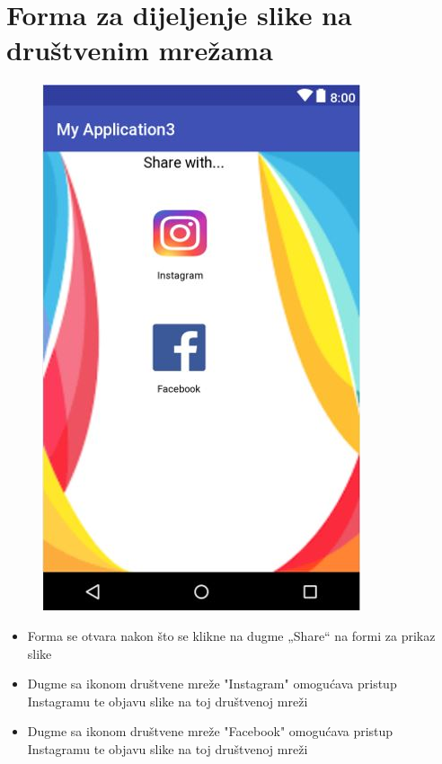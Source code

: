 \documentclass[12pt]{scrreprt}
\begin{document}
\section{Forma za dijeljenje slike na društvenim mrežama}

\begin{figure}[h]
	\begin{Center}
		\includegraphics{image9}
	\end{Center}
\end{figure}

\begin{itemize}
	\item	Forma se otvara nakon što se klikne na dugme „Share“ na formi za prikaz slike
	\item	Dugme sa ikonom društvene mreže "Instagram" omogućava pristup Instagramu te objavu slike na toj društvenoj mreži
	\item  Dugme sa ikonom društvene mreže "Facebook" omogućava pristup Instagramu te objavu slike na toj društvenoj mreži
\end{itemize}
\end{document}
